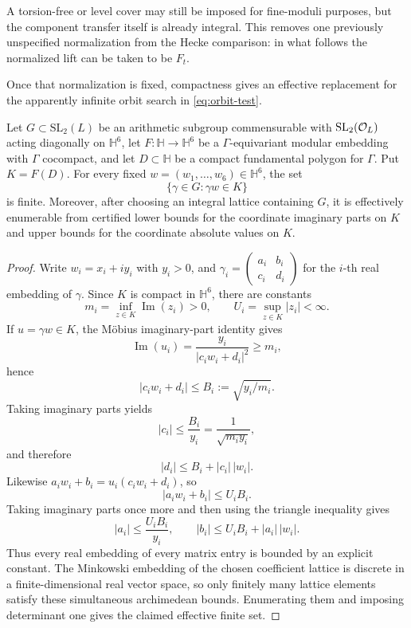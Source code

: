 A torsion-free or level cover may still be imposed for fine-moduli purposes, but the
component transfer itself is already integral.  This removes one previously unspecified
normalization from the Hecke comparison: in what follows the normalized lift can be
taken to be $F_t$.

Once that normalization is fixed, compactness gives an effective replacement for the
apparently infinite orbit search in \eqref{eq:orbit-test}.

\begin{proposition}\label{prop:effectiveorbit}
Let $G\subset\mathrm{SL}_2(L)$ be an arithmetic subgroup commensurable with
$\mathrm{SL}_2(\mathcal O_L)$ acting diagonally on $\mathbb H^6$, let
$F:\mathbb H\to\mathbb H^6$ be a $\Gamma$-equivariant modular embedding with
$\Gamma$ cocompact, and let $D\subset\mathbb H$ be a compact fundamental polygon for
$\Gamma$.  Put $K=F(D)$.  For every fixed $w=(w_1,\ldots,w_6)\in\mathbb H^6$, the set
\[
 \{\gamma\in G:\gamma w\in K\}
\]
is finite.  Moreover, after choosing an integral lattice containing $G$, it is
effectively enumerable from certified lower bounds for the coordinate imaginary parts
on $K$ and upper bounds for the coordinate absolute values on $K$.
\end{proposition}
\begin{proof}
Write $w_i=x_i+i y_i$ with $y_i>0$, and
$\gamma_i=\left(\begin{smallmatrix}a_i&b_i\\c_i&d_i\end{smallmatrix}\right)$ for the
$i$-th real embedding of $\gamma$.  Since $K$ is compact in $\mathbb H^6$, there are
constants
\[
 m_i=\inf_{z\in K}\operatorname{Im}(z_i)>0,
 \qquad
 U_i=\sup_{z\in K}|z_i|<\infty.
\]
If $u=\gamma w\in K$, the Möbius imaginary-part identity gives
\[
 \operatorname{Im}(u_i)=\frac{y_i}{|c_iw_i+d_i|^2}\ge m_i,
\]
hence
\[
 |c_iw_i+d_i|\le B_i:=\sqrt{y_i/m_i}.
\]
Taking imaginary parts yields
\[
 |c_i|\le\frac{B_i}{y_i}=\frac1{\sqrt{m_i y_i}},
\]
and therefore
\[
 |d_i|\le B_i+|c_i|\,|w_i|.
\]
Likewise $a_iw_i+b_i=u_i(c_iw_i+d_i)$, so
\[
 |a_iw_i+b_i|\le U_iB_i.
\]
Taking imaginary parts once more and then using the triangle inequality gives
\[
 |a_i|\le\frac{U_iB_i}{y_i},
 \qquad
 |b_i|\le U_iB_i+|a_i|\,|w_i|.
\]
Thus every real embedding of every matrix entry is bounded by an explicit constant.
The Minkowski embedding of the chosen coefficient lattice is discrete in a finite-dimensional
real vector space, so only finitely many lattice elements satisfy these simultaneous
archimedean bounds.  Enumerating them and imposing determinant one gives the claimed
effective finite set.
\end{proof}

